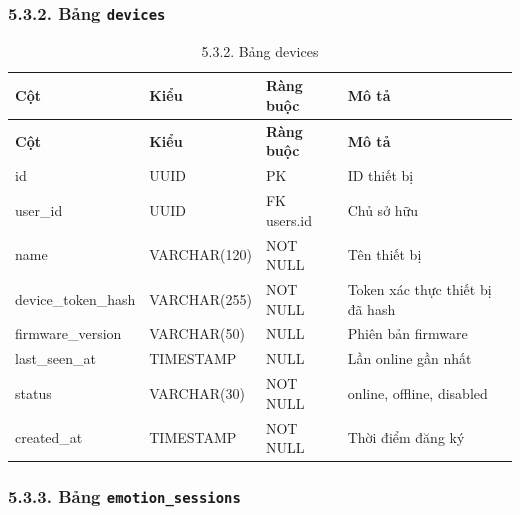 \documentclass[12pt,a4paper]{article}
\begin{document}
\subsubsection*{5.3.2. Bảng \texttt{devices}}

\begin{center}
\scriptsize
\begin{longtable}{|P{0.18\textwidth}|P{0.25\textwidth}|P{0.25\textwidth}|P{0.22\textwidth}|}
\caption{5.3.2. Bảng devices}\\
\hline
\textbf{Cột} & \textbf{Kiểu} & \textbf{Ràng buộc} & \textbf{Mô tả} \\
\hline
\endfirsthead
\hline
\textbf{Cột} & \textbf{Kiểu} & \textbf{Ràng buộc} & \textbf{Mô tả} \\
\hline
\endhead
id & UUID & PK & ID thiết bị \\
\hline
user\_id & UUID & FK users.id & Chủ sở hữu \\
\hline
name & VARCHAR(120) & NOT NULL & Tên thiết bị \\
\hline
device\_token\_hash & VARCHAR(255) & NOT NULL & Token xác thực thiết bị đã hash \\
\hline
firmware\_version & VARCHAR(50) & NULL & Phiên bản firmware \\
\hline
last\_seen\_at & TIMESTAMP & NULL & Lần online gần nhất \\
\hline
status & VARCHAR(30) & NOT NULL & online, offline, disabled \\
\hline
created\_at & TIMESTAMP & NOT NULL & Thời điểm đăng ký \\
\hline
\end{longtable}
\normalsize
\end{center}

\subsubsection*{5.3.3. Bảng \texttt{emotion\_sessions}}
\end{document}
